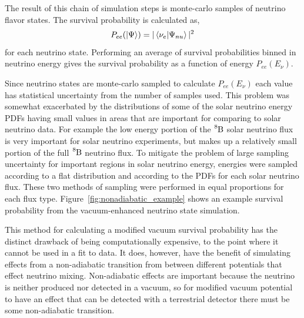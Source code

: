 The result of this chain of simulation steps is monte-carlo samples
of neutrino flavor states. The survival probability is calculated as,
\begin{equation}
P_{ee}(\ket{\Psi}) = |\braket{\nu_{e}}{\Psi_{nu}}|^2
\end{equation}
for each neutrino state.
Performing an average of survival probabilities binned in neutrino energy 
gives the survival probability as a function of energy $P_{ee}(E_{\nu})$.

Since neutrino states are monte-carlo sampled to calculate $P_{ee}(E_{\nu})$
each value has statistical uncertainty from the number of samples used.
This problem was somewhat exacerbated by the distributions of some of the
solar neutrino energy PDFs having small values in areas that are important for
comparing to solar neutrino data. For example the low energy portion of the
$\ce{^{8}B}$ solar neutrino flux is very important for solar neutrino experiments,
but makes up a relatively small portion of the full $\ce{^{8}B}$ neutrino flux.
To mitigate the problem of large sampling uncertainty for important regions in
solar neutrino energy, energies were sampled according to a flat distribution
and according to the PDFs for each solar neutrino flux. These two methods of sampling
were performed in equal proportions for each flux type.
Figure~\ref{fig:nonadiabatic_example} shows an example survival probability
from the vacuum-enhanced neutrino state simulation.

This method for calculating a modified vacuum survival probability has the
distinct drawback of being computationally expensive, to the point
where it cannot be used in a fit to data.
It does, however, have the benefit of simulating effects from a non-adiabatic
transition from between different potentials that effect neutrino mixing.
Non-adiabatic effects are important because the neutrino is neither produced nor
detected in a vacuum, so for modified vacuum potential to have an effect
that can be detected with a terrestrial detector there must be some
non-adiabatic transition.

